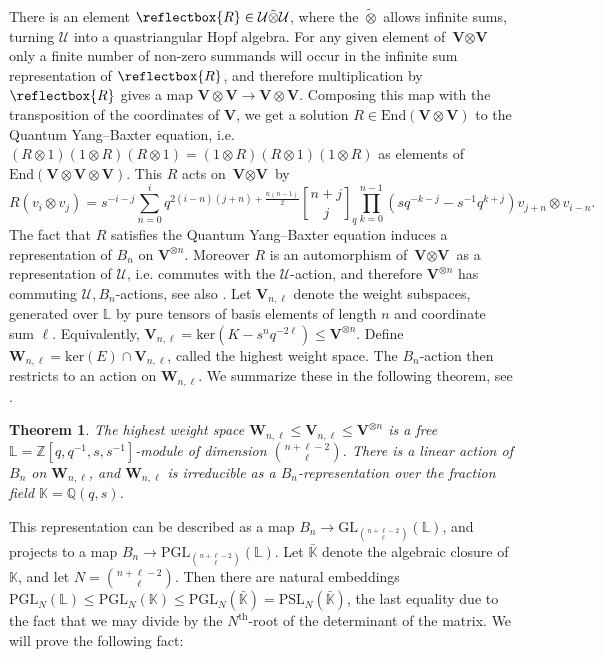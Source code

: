 \documentclass[letterpaper]{amsart}
\newtheorem{theorem}{Theorem}[section]
\begin{document}
There is an element $\reflectbox{R} \in \mathcal{U} \tilde{\otimes} \mathcal{U}$, where the $\tilde{\otimes}$ allows infinite sums, turning $\mathcal{U}$ into a quastriangular Hopf algebra. For any given element of $\textbf{V} \otimes \textbf{V}$ only a finite number of non-zero summands will occur in the infinite sum representation of $\reflectbox{R}$, and therefore multiplication by $\reflectbox{R}$ gives a map $\textbf{V} \otimes \textbf{V} \to \textbf{V} \otimes \textbf{V}$. Composing this map with the transposition of the coordinates of $\textbf{V}$, we get a solution $R \in \mathrm{End}(\textbf{V} \otimes \textbf{V})$ to the Quantum Yang--Baxter equation, i.e. $(R \otimes 1) (1 \otimes R) (R \otimes 1) = (1 \otimes R) (R \otimes 1) (1 \otimes R)$ as elements of $\mathrm{End}(\textbf{V} \otimes \textbf{V} \otimes \textbf{V})$. This $R$ acts on $\textbf{V} \otimes \textbf{V}$ by
$$R(v_i \otimes v_j) = s^{-i-j}\sum_{n=0}^{i} q^{2(i-n)(j+n)+\frac{n(n-1)}{2}}{n + j \brack j}_q\prod_{k=0}^{n-1} (sq^{-k-j} - s^{-1}q^{k + j})v_{j + n} \otimes v_{i-n}.$$
The fact that $R$ satisfies the Quantum Yang--Baxter equation induces a representation of $B_n$ on $\textbf{V}^{\otimes n}$. Moreover $R$ is an automorphism of $\textbf{V}\otimes\textbf{V}$ as a representation of $\mathcal{U}$, i.e. commutes with the $\mathcal{U}$-action, and therefore $\textbf{V}^{\otimes n}$ has commuting $\mathcal{U},B_n$-actions, see also \cite[Theorem $7$]{jackson2011lawrence}.
Let $\textbf{V}_{n,\ell}$ denote the weight subspaces, generated over $\mathbb{L}$ by pure tensors of basis elements of length $n$ and coordinate sum $\ell$. Equivalently, $\textbf{V}_{n,\ell} = \mathrm{ker}(K - s^nq^{-2\ell}) \leq \textbf{V}^{\otimes n}$.
Define $\textbf{W}_{n,\ell} = \mathrm{ker}(E)\cap\textbf{V}_{n,\ell}$, called the highest weight space. The $B_n$-action then restricts to an action on $\textbf{W}_{n,\ell}$. We summarize these in the following theorem, see \cite[Theorems 1, 3]{jackson2011lawrence}.
\begin{theorem}
\label{Jackson irreducibility}
    The highest weight space $\textbf{W}_{n,\ell} \leq \textbf{V}_{n,\ell} \leq \textbf{V}^{\otimes n}$ is a free $\mathbb{L}=\mathbb{Z}[q,q^{-1},s,s^{-1}]$-module of dimension $\binom{n+\ell-2}{\ell}$. There is a linear action of $B_n$ on $\textbf{W}_{n,\ell}$, and $\textbf{W}_{n, \ell}$ is irreducible as a $B_n$-representation over the fraction field $\mathbb{K} = \mathbb{Q}(q,s)$.
\end{theorem}
This representation can be described as a map $B_n \to \mathrm{GL}_{\binom{n + \ell - 2}{\ell}}(\mathbb{L})$, and projects to a map $B_n \to \mathrm{PGL}_{\binom{n+\ell - 2}{\ell}}(\mathbb{L})$. Let $\bar{\mathbb{K}}$ denote the algebraic closure of $\mathbb{K}$, and let $N = \binom{n+\ell-2}{\ell}$. Then there are natural embeddings $\mathrm{PGL}_N(\mathbb{L}) \leq \mathrm{PGL}_N(\mathbb{K}) \leq \mathrm{PGL}_N(\bar{\mathbb{K}}) = \mathrm{PSL}_N(\bar{\mathbb{K}})$, the last equality due to the fact that we may divide by the $N^\mathrm{th}$-root of the determinant of the matrix. We will prove the following fact:
\end{document}
